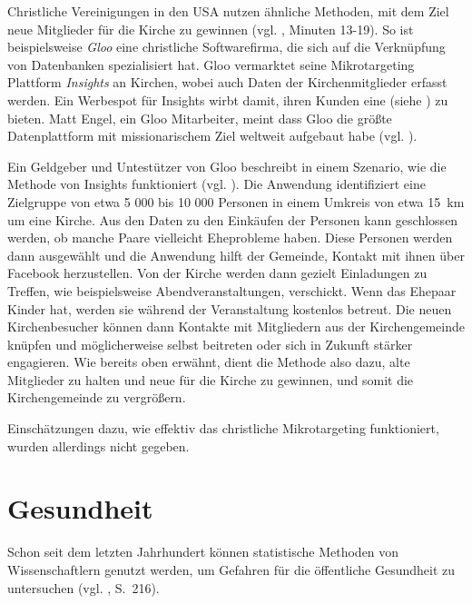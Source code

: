 Christliche Vereinigungen in den USA nutzen ähnliche Methoden, mit dem Ziel neue Mitglieder für die Kirche
zu gewinnen (vgl. \cite{Viken}, Minuten 13-19). So ist beispielsweise \emph{Gloo} eine christliche Softwarefirma,
die sich auf die Verknüpfung von Datenbanken spezialisiert hat. Gloo vermarktet seine Mikrotargeting Plattform
\emph{Insights} an Kirchen, wobei auch Daten der Kirchenmitglieder erfasst werden. Ein Werbespot für Insights
wirbt damit, ihren Kunden eine \grqq{} (siehe \cite{Viken}) zu bieten. Matt Engel, ein Gloo
Mitarbeiter, meint dass Gloo die größte Datenplattform mit missionarischem Ziel weltweit aufgebaut habe (vgl. \cite{Viken}).

Ein Geldgeber und Untestützer von Gloo beschreibt in einem Szenario, wie die Methode von Insights funktioniert (vgl. \cite{Viken}).
Die Anwendung identifiziert eine Zielgruppe von etwa 5 000 bis 10 000 Personen in einem Umkreis von etwa 15~km um eine Kirche.
Aus den Daten zu den Einkäufen der Personen kann geschlossen werden, ob manche Paare vielleicht Eheprobleme haben.
Diese Personen werden dann ausgewählt und die Anwendung hilft der Gemeinde, Kontakt mit ihnen über Facebook herzustellen.
Von der Kirche werden dann gezielt Einladungen zu Treffen, wie beispielsweise Abendveranstaltungen, verschickt. Wenn das Ehepaar
Kinder hat, werden sie während der Veranstaltung kostenlos betreut. Die neuen Kirchenbesucher können dann Kontakte mit
Mitgliedern aus der Kirchengemeinde knüpfen und möglicherweise selbst beitreten oder sich in Zukunft stärker engagieren.
Wie bereits oben erwähnt, dient die Methode also dazu, alte Mitglieder zu halten und neue für die Kirche zu gewinnen,
und somit die Kirchengemeinde zu vergrößern.

Einschätzungen dazu, wie effektiv das christliche Mikrotargeting funktioniert, wurden allerdings nicht gegeben.

\section{Gesundheit}

Schon seit dem letzten Jahrhundert können statistische Methoden von Wissenschaftlern
genutzt werden, um Gefahren für die öffentliche Gesundheit zu untersuchen (vgl. \cite{Proctor}, S.~216).

